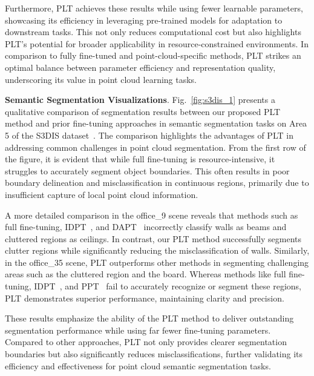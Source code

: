 Furthermore, PLT achieves these results while using fewer learnable parameters, showcasing its efficiency in leveraging pre-trained models for adaptation to downstream tasks. This not only reduces computational cost but also highlights PLT's potential for broader applicability in resource-constrained environments. In comparison to fully fine-tuned and point-cloud-specific methods, PLT strikes an optimal balance between parameter efficiency and representation quality, underscoring its value in point cloud learning tasks.

\textbf{Semantic Segmentation Visualizations}. Fig.~\ref{fig:s3dis_1} presents a qualitative comparison of segmentation results between our proposed PLT method and prior fine-tuning approaches in semantic segmentation tasks on Area 5 of the S3DIS dataset~\cite{armeni20163d}. The comparison highlights the advantages of PLT in addressing common challenges in point cloud segmentation. From the first row of the figure, it is evident that while full fine-tuning is resource-intensive, it struggles to accurately segment object boundaries. This often results in poor boundary delineation and misclassification in continuous regions, primarily due to insufficient capture of local point cloud information. 

A more detailed comparison in the office\_9 scene reveals that methods such as full fine-tuning, IDPT~\cite{zha2023instance}, and DAPT~\cite{zhou2024dynamic} incorrectly classify walls as beams and cluttered regions as ceilings. In contrast, our PLT method successfully segments clutter regions while significantly reducing the misclassification of walls. Similarly, in the office\_35 scene, PLT outperforms other methods in segmenting challenging areas such as the cluttered region and the board. Whereas methods like full fine-tuning, IDPT~\cite{zha2023instance}, and PPT~\cite{zhang2024positional} fail to accurately recognize or segment these regions, PLT demonstrates superior performance, maintaining clarity and precision. 

These results emphasize the ability of the PLT method to deliver outstanding segmentation performance while using far fewer fine-tuning parameters. Compared to other approaches, PLT not only provides clearer segmentation boundaries but also significantly reduces misclassifications, further validating its efficiency and effectiveness for point cloud semantic segmentation tasks.




